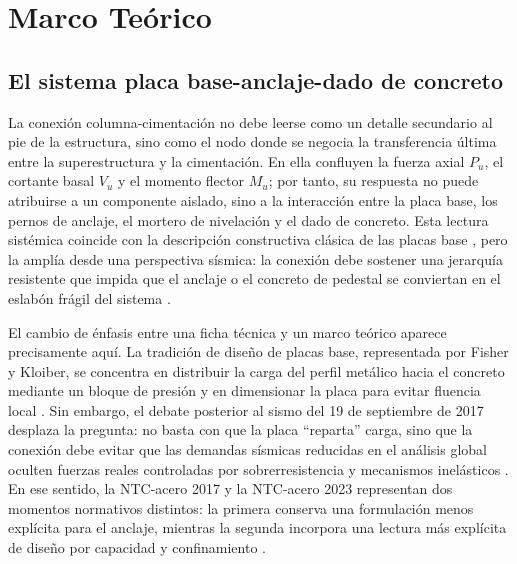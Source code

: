 \chapter{Marco Teórico}

\section{El sistema placa base-anclaje-dado de concreto}

La conexión columna-cimentación no debe leerse como un detalle secundario al pie de la estructura, sino como el nodo donde se negocia la transferencia última entre la superestructura y la cimentación. En ella confluyen la fuerza axial $P_u$, el cortante basal $V_u$ y el momento flector $M_u$; por tanto, su respuesta no puede atribuirse a un componente aislado, sino a la interacción entre la placa base, los pernos de anclaje, el mortero de nivelación y el dado de concreto. Esta lectura sistémica coincide con la descripción constructiva clásica de las placas base \cite{GarciaPalencia_2008, FisherKloiber_2006}, pero la amplía desde una perspectiva sísmica: la conexión debe sostener una jerarquía resistente que impida que el anclaje o el concreto de pedestal se conviertan en el eslabón frágil del sistema \cite{AISC_341_2022}.

El cambio de énfasis entre una ficha técnica y un marco teórico aparece precisamente aquí. La tradición de diseño de placas base, representada por Fisher y Kloiber, se concentra en distribuir la carga del perfil metálico hacia el concreto mediante un bloque de presión y en dimensionar la placa para evitar fluencia local \cite{FisherKloiber_2006}. Sin embargo, el debate posterior al sismo del 19 de septiembre de 2017 desplaza la pregunta: no basta con que la placa ``reparta'' carga, sino que la conexión debe evitar que las demandas sísmicas reducidas en el análisis global oculten fuerzas reales controladas por sobrerresistencia y mecanismos inelásticos \cite{SMIE_2017, TapiaHernandez_2018}. En ese sentido, la NTC-acero 2017 y la NTC-acero 2023 representan dos momentos normativos distintos: la primera conserva una formulación menos explícita para el anclaje, mientras la segunda incorpora una lectura más explícita de diseño por capacidad y confinamiento \cite{GCDMX_NTC_DCEA_2017, GCDMX_NTC_DCEA_2023}.

